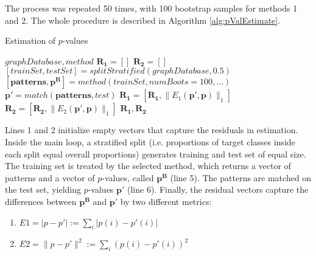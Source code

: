 \documentclass{article}
\begin{document}
The process was repeated 50 times, with 100 bootstrap samples for methods 1 and 2. The whole procedure is described in Algorithm \ref{alg:pValEstimate}.
\begin{algorithm}
  \caption{Estimation of $p$-values}
  \label{alg:pValEstimate}
\begin{algorithmic}[1]
  \Require $graphDatabase, method$ 
  \State $\mathbf{R_1}=\left[ \right]$
  \State $\mathbf{R_2}=\left[ \right]$
    \State $[trainSet, testSet] = splitStratified(graphDatabase,0.5)$ 
    \State $\left[ \mathbf{patterns}, \mathbf{p^B} \right] = method(trainSet,numBoots=100,\dots)$ 
    \State $\mathbf{p'} = match(\mathbf{patterns}, test)$ 
    \State $ \mathbf{R_1} = \left[ \mathbf{R_1},\| E_1(\mathbf{p'}, \mathbf{p})\|_1 \right]$
    \State $ \mathbf{R_2} = \left[ \mathbf{R_2},\| E_2(\mathbf{p'}, \mathbf{p})\|_1 \right]$
  \EndFor
  \Ensure $\mathbf{R_1},\mathbf{R_2}$
\end{algorithmic}
\end{algorithm}

Lines 1 and 2 initialize empty vectors that capture the residuals in estimation. Inside the main loop, a stratified split (i.e. proportions of target classes inside each split equal overall proportions) generates training and test set of equal size. The training set is treated by the selected method, which returns a vector of patterns and a vector of $p$-values, called $\mathbf{p^B}$ (line 5). The patterns are matched on the test set, yielding $p$-values $\mathbf{p'}$ (line 6). Finally, the residual vectors capture the differences between $\mathbf{p^B}$ and  $\mathbf{p'}$ by two different metrics:
\begin{enumerate}
  \item $E1 = |p-p'| := \sum_i |p(i) -p'(i)|$
  \item $E2 = \|p-p'\|^2 := \sum_i (p(i) -p'(i))^2$
\end{enumerate}




\end{document}
